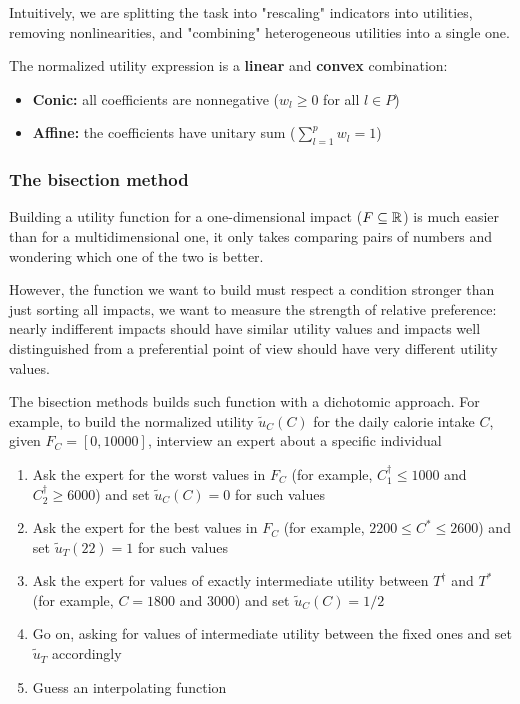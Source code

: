 Intuitively, we are splitting the task into "rescaling" indicators into utilities, removing nonlinearities, and "combining" heterogeneous utilities into a single one.

The normalized utility expression is a \textbf{linear} and \textbf{convex} combination: 
\begin{itemize}
	\item \textbf{Conic:} all coefficients are nonnegative ($w_l \geq 0$ for all $l \in P$)
	
	\item \textbf{Affine:} the coefficients have unitary sum ($\sum_{l = 1}^p w_l = 1$)
\end{itemize}

\subsubsection{The bisection method}

Building a utility function for a one-dimensional impact ($F \subseteq \operatorname{\mathbb{R}}$) is much easier than for a multidimensional one, it only takes comparing pairs of numbers and wondering which one of the two is better. 

However, the function we want to build must respect a condition stronger than just sorting all impacts, we want to measure the strength of relative preference: nearly indifferent impacts should have similar utility values and impacts well distinguished from a preferential point of view should have very different utility values.

The bisection methods builds such function with a dichotomic approach. For example, to build the normalized utility $\tilde u_C(C)$ for the daily calorie intake $C$, given $F_C = [0, 10000]$, interview an expert about a specific individual
\begin{enumerate}
	\item Ask the expert for the worst values in $F_C$ (for example, $C_1^\dag \leq 1000$ and $C_2^\dag \geq 6000$) and set $\tilde u_C (C) = 0$ for such values
	
	\item Ask the expert for the best values in $F_C$ (for example, $2200 \leq C^\ast \leq 2600$) and set $\tilde u_T (22) = 1$ for such values
	
	\item Ask the expert for values of exactly intermediate utility between $T^\dag$ and $T^\ast$ (for example, $C = 1800$ and $3000$) and set $\tilde u_C (C) = 1/2$
	
	\item Go on, asking for values of intermediate utility between the fixed ones and set $\tilde u_T$ accordingly
	
	\item Guess an interpolating function
\end{enumerate}

